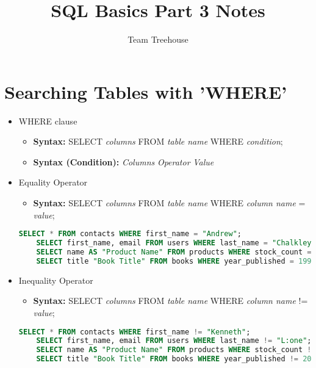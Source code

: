 \documentclass[12pt]{article}
\begin{document}
\title{SQL Basics Part 3 Notes}
\author{Team Treehouse}
\maketitle

\bigskip

\section{Searching Tables with 'WHERE'}

\bigskip

\begin{itemize}
    \item WHERE clause
    \begin{itemize}
        \item \textbf{Syntax:} SELECT \textit{columns} FROM \textit{table name} WHERE \textit{condition};
        \item \textbf{Syntax (Condition):} \textit{Columns} \textit{Operator} \textit{Value}
    \end{itemize}

    \item Equality Operator
    \begin{itemize}
        \item \textbf{Syntax:} SELECT \textit{columns} FROM \textit{table name} WHERE \textit{column name} = \textit{value};
    \end{itemize}

    \begin{lstlisting}[language=SQL]
    SELECT * FROM contacts WHERE first_name = "Andrew";
    SELECT first_name, email FROM users WHERE last_name = "Chalkley";
    SELECT name AS "Product Name" FROM products WHERE stock_count = 0;
    SELECT title "Book Title" FROM books WHERE year_published = 1999;
    \end{lstlisting}

    \item Inequality Operator
    \begin{itemize}
        \item \textbf{Syntax:} SELECT \textit{columns} FROM \textit{table name} WHERE \textit{column name} != \textit{value};
    \end{itemize}

    \begin{lstlisting}[language=SQL]
    SELECT * FROM contacts WHERE first_name != "Kenneth";
    SELECT first_name, email FROM users WHERE last_name != "L:one";
    SELECT name AS "Product Name" FROM products WHERE stock_count != 0;
    SELECT title "Book Title" FROM books WHERE year_published != 2015;
    \end{lstlisting}


\end{itemize}
\end{document}
